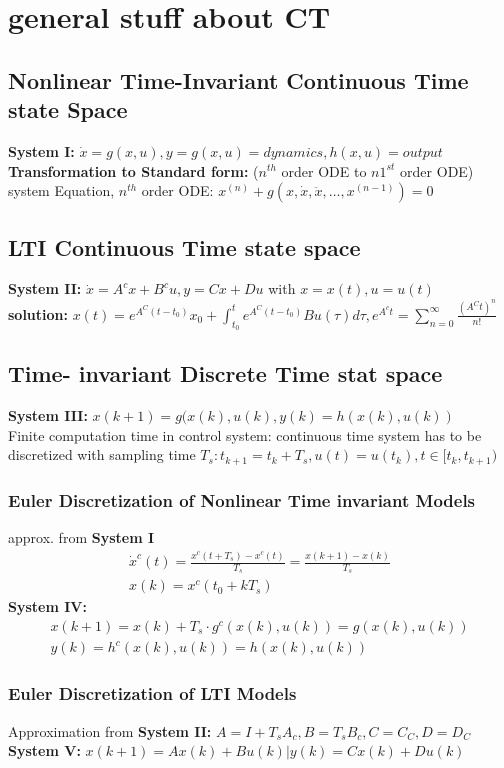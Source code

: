 \section{general stuff about CT}
\subsection{Nonlinear Time-Invariant Continuous Time state Space}
\textbf{System I:} $\Dot{x} = g(x,u), y = g(x,u) = dynamics, h(x,u) = output$\\
\textbf{Transformation to Standard form:} ($ n^{th}$ order ODE to $n 1^{st}$ order ODE)\\
system Equation, $n^{th}$ order ODE: $x^{(n)} + g(x,\dot x, \ddot{x},\dots, x^{(n-1)}) = 0$
\subsection{LTI Continuous Time state space}
\textbf{System II:} $\dot x = A^c x + B^c u, y = Cx+Du$ with $x=x(t), u = u(t)$\\
\textbf{solution:} $x(t) = e^{A^C(t-t_0)}x_0 + \int^t_{t_0}e^{A^C(t-t_0)}B u(\tau)d\tau, e^{A^{c}t} = \sum^\infty_{n=0} \frac{(A^Ct)^n}{n!}$
\subsection{Time- invariant Discrete Time stat space}
\textbf{System III: }$x(k+1) = g(x(k), u(k), y(k)=h(x(k),u(k))$\\
Finite computation time in control system: continuous time system has to be discretized with sampling time $T_s: t_{k+1} = t_k +T_s, u(t) = u(t_k), t\in [t_k, t_{k+1})$ 
\subsubsection{Euler Discretization of Nonlinear Time invariant Models}
approx. from \textbf{System I}\begin{gather*}
    \dot x^c (t) = \frac{x^c(t+T_s) - x^c(t)}{T_s} =\frac{x(k+1) - x(k)}{T_s}\\x(k) = x^c(t_0+kT_s)
\end{gather*}
\textbf{System IV: }\begin{gather*} x(k+1) = x(k) + T_s \cdot g^c(x(k),u(k)) = g(x(k),u(k))\\ y(k) = h^c(x(k),u(k)) = h(x(k),u(k))\end{gather*}
\subsubsection{Euler Discretization of LTI Models}
Approximation from \textbf{System II:} $A = I+T_s A_c, B = T_s B_c, C = C_C, D = D_C$\\ 
\textbf{System V: } $x(k+1) = Ax(k) + Bu(k) | y(k) = Cx(k) + Du(k)$
